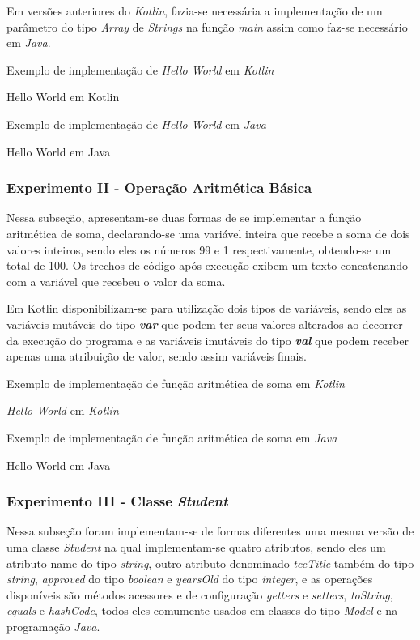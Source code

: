 Em versões anteriores do \textit{Kotlin}, fazia-se necessária a implementação de um parâmetro do tipo \textit{Array} de \textit{Strings} na função \textit{main} assim como faz-se necessário em \textit{Java}.


Exemplo de implementação de \textit{Hello World} em \textit{Kotlin}
\caption{Hello World em Kotlin}
 

Exemplo de implementação de \textit{Hello World} em \textit{Java}
\caption{Hello World em Java}
 


\subsubsection{Experimento II - Operação Aritmética Básica}

Nessa subseção, apresentam-se duas formas de se implementar a função aritmética de soma, declarando-se uma variável inteira que recebe a soma de dois valores inteiros, sendo eles os números 99 e 1 respectivamente, obtendo-se um total de 100. Os trechos de código após execução exibem um texto concatenando com a variável que recebeu o valor da soma.

Em Kotlin disponibilizam-se para utilização dois tipos de variáveis, sendo eles as variáveis mutáveis do tipo \textbf{\textit{var}} que podem ter seus valores alterados ao decorrer da execução do programa e as variáveis imutáveis do tipo \textbf{\textit{val}} que podem receber apenas uma atribuição de valor, sendo assim variáveis finais.

Exemplo de implementação de função aritmética de soma em \textit{Kotlin}
\caption{\textit{Hello World} em \textit{Kotlin}}
 

Exemplo de implementação de função aritmética de soma em \textit{Java}
\caption{Hello World em Java}
 


\subsubsection{Experimento III - Classe \textit{Student}}

Nessa subseção foram implementam-se de formas diferentes uma mesma versão de uma classe \textit{Student} na qual implementam-se quatro atributos, sendo eles um atributo name do tipo \textit{string}, outro atributo denominado \textit{tccTitle} também do tipo \textit{string}, \textit{approved} do tipo \textit{boolean} e \textit{yearsOld} do tipo \textit{integer}, e as operações disponíveis são métodos acessores e de configuração \textit{getters} e \textit{setters}, \textit{toString}, \textit{equals} e \textit{hashCode}, todos eles comumente usados em classes do tipo \textit{Model} e na programação \textit{Java}.

